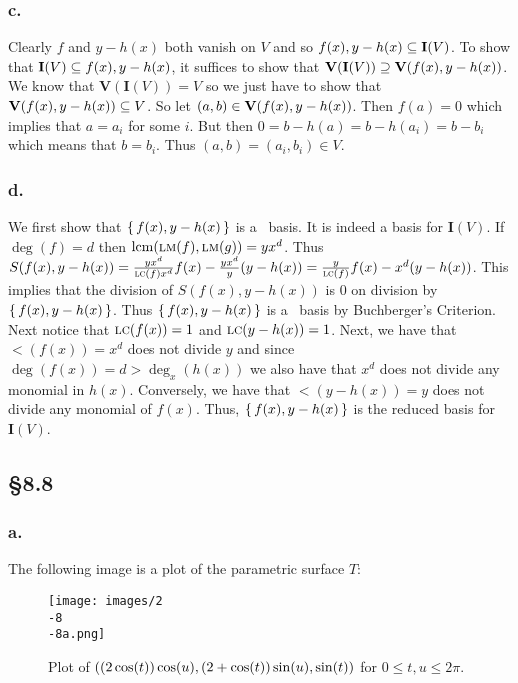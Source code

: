\documentclass[letterpaper]{article}
\begin{document}
\subsubsection*{c.}

Clearly $f$ and $y - h(x)$ both vanish on $V$ and so $\ideal{f(x), y - h(x)} \subseteq \mathbf{I}(V)$.
To show that $\mathbf{I}(V) \subseteq \ideal{f(x), y - h(x)}$, it suffices to show that $\mathbf{V}(\mathbf{I}(V)) \containseq \mathbf{V}(\ideal{f(x), y - h(x)})$.
We know that $\mathbf{V}(\mathbf{I}(V)) = V$ so we just have to show that $\mathbf{V}(\ideal{f(x), y - h(x)}) \subseteq V$.
So let $(a, b) \in \mathbf{V}(\ideal{f(x), y - h(x)})$.
Then $f(a) = 0$ which implies that $a = a_{i}$ for some $i$.
But then $0 = b - h(a) = b - h(a_{i}) = b - b_{i}$ which means that $b = b_{i}$.
Thus $(a, b) = (a_{i}, b_{i}) \in V$.

\subsubsection*{d.}

We first show that $\set{f(x), y - h(x)}$ is a \Grobner\ basis.
It is indeed a basis for $\mathbf{I}(V)$.
If $\deg(f) = d$ then $\operatorname{lcm}(\operatorname{\textsc{lm}}(f), \operatorname{\textsc{lm}}(g)) = yx^{d}$.
Thus $S(f(x), y - h(x)) = \frac{yx^{d}}{\operatorname{\textsc{lc}}(f)x^{d}}f(x) - \frac{yx^{d}}{y}(y - h(x)) = \frac{y}{\operatorname{\textsc{lc}}(f)} f(x) - x^{d}(y - h(x))$.
This implies that the division of $S(f(x), y - h(x))$ is $0$ on division by $\set{f(x), y - h(x)}$.
Thus $\set{f(x), y - h(x)}$ is a \Grobner\ basis by Buchberger's Criterion.
Next notice that $\operatorname{\textsc{lc}}(f(x)) = 1$ and $\operatorname{\textsc{lc}}(y - h(x)) = 1$.
Next, we have that $\lt(f(x)) = x^{d}$ does not divide $y$ and since $\deg(f(x)) = d > \deg_{x}(h(x))$ we also have that $x^{d}$ does not divide any monomial in $h(x)$.
Conversely, we have that $\lt(y - h(x)) = y$ does not divide any monomial of $f(x)$.
Thus, $\set{f(x), y - h(x)}$ is the reduced \Grobner basis for $\mathbf{I}(V)$.

\subsection*{\S 8.8}

\subsubsection*{a.} The following image is a plot of the parametric surface $T\colon$

\begin{figure}[H]
  \centering
  \texttt{[image: images/2\\-8\\-8a.png]}
  \caption{Plot of $\pqty{(2 \cos(t))\cos(u), (2 + \cos(t))\sin(u), \sin(t)}$ for $0 \leq t, u \leq 2 \pi$.}
\end{figure}
\end{document}
